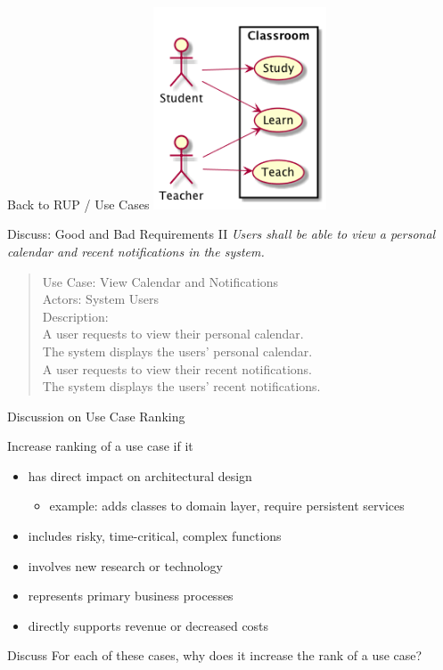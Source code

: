 \documentclass[10pt,t,a4paper]{beamer}
\begin{document}
\begin{frame}[label=sec-1-20]{Back to RUP / Use Cases}
\includegraphics[height=6cm]{FUseCases.png}
\end{frame}

\begin{frame}[label=sec-1-21]{Discuss: Good and Bad Requirements II}
\emph{Users shall be able to view a personal calendar and recent notifications in the system.}

\begin{verse}
Use Case: View Calendar and Notifications \\
Actors: System Users \\
Description: \\
\hspace*{2em}A user requests to view their personal calendar. \\
\hspace*{4em}The system displays the users' personal calendar. \\
\hspace*{2em}A user requests to view their recent notifications. \\
\hspace*{4em}The system displays the users' recent notifications. \\
\end{verse}
\end{frame}
\begin{frame}[label=sec-1-22]{Discussion on Use Case Ranking}
\begin{block}{Increase ranking of a use case if it}
\begin{itemize}
\item has direct impact on architectural design
\begin{itemize}
\item example: adds classes to domain layer, require persistent services
\end{itemize}
\item includes risky, time-critical, complex functions
\item involves new research or technology
\item represents primary business processes
\item directly supports revenue or decreased costs
\end{itemize}
\end{block}
\begin{block}{Discuss}
For each of these cases, why does it increase the rank of a use case?
\end{block}
\end{frame}
\end{document}
